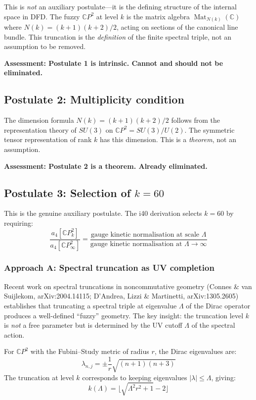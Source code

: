 \documentclass[11pt,a4paper]{article}
\newcommand{\CP}{\mathbb{C}P}
\begin{document}
This is \emph{not} an auxiliary postulate---it is the defining structure of the internal space in DFD. The fuzzy $\CP^2$ at level $k$ is the matrix algebra $\operatorname{Mat}_{N(k)}(\mathbb{C})$ where $N(k) = (k+1)(k+2)/2$, acting on sections of the canonical line bundle. This truncation is the \emph{definition} of the finite spectral triple, not an assumption to be removed.

\textbf{Assessment: Postulate 1 is intrinsic. Cannot and should not be eliminated.}

\subsection{Postulate 2: Multiplicity condition}

The dimension formula $N(k) = (k+1)(k+2)/2$ follows from the representation theory of $SU(3)$ on $\CP^2 = SU(3)/U(2)$. The symmetric tensor representation of rank $k$ has this dimension. This is a \emph{theorem}, not an assumption.

\textbf{Assessment: Postulate 2 is a theorem. Already eliminated.}

\subsection{Postulate 3: Selection of $k = 60$}

This is the genuine auxiliary postulate. The i40 derivation selects $k = 60$ by requiring:
\begin{equation}
\frac{a_4[\CP^2_k]}{a_4[\CP^2_\infty]} = \frac{\text{gauge kinetic normalisation at scale }\Lambda}{\text{gauge kinetic normalisation at } \Lambda \to \infty}
\end{equation}

\subsubsection{Approach A: Spectral truncation as UV completion}

Recent work on spectral truncations in noncommutative geometry (Connes \& van Suijlekom, arXiv:2004.14115; D'Andrea, Lizzi \& Martinetti, arXiv:1305.2605) establishes that truncating a spectral triple at eigenvalue $\Lambda$ of the Dirac operator produces a well-defined ``fuzzy'' geometry. The key insight: the truncation level $k$ is \emph{not} a free parameter but is determined by the UV cutoff $\Lambda$ of the spectral action.

For $\CP^2$ with the Fubini--Study metric of radius $r$, the Dirac eigenvalues are:
\begin{equation}
\lambda_{n,j} = \pm \frac{1}{r}\sqrt{(n+1)(n+3)}
\end{equation}
The truncation at level $k$ corresponds to keeping eigenvalues $|\lambda| \leq \Lambda$, giving:
\begin{equation}
k(\Lambda) = \lfloor \sqrt{\Lambda^2 r^2 + 1} - 2 \rfloor
\end{equation}
\end{document}
